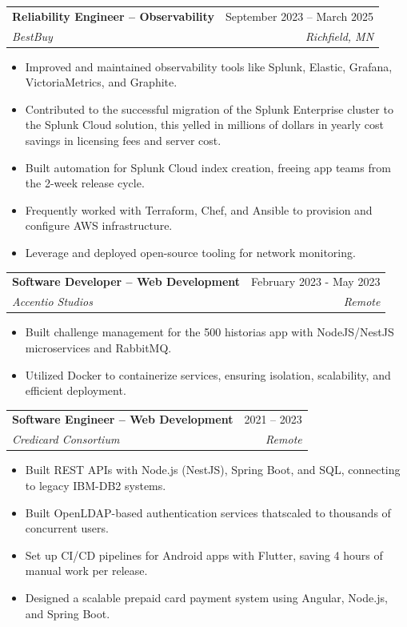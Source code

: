 \documentclass[letterpaper,11pt]{article}
\makeatletter
\newcommand{\resumeSubheading}[4]{
  \vspace{-2pt}\item
    \begin{tabular*}{0.97\textwidth}[t]{l@{\extracolsep{\fill}}r}
      \textbf{#1} & #2 \\
      \textit{\small#3} & \textit{\small #4} \\
    \end{tabular*}\vspace{-7pt}
}
\makeatother
\begin{document}
    \resumeSubheading
      {Reliability Engineer – Observability}{September 2023 – March 2025}
      {BestBuy}{Richfield, MN}
      \begin{itemize}
      \setlength\itemsep{-0.1em}
      \item Improved and maintained observability tools like Splunk, Elastic, Grafana, VictoriaMetrics, and Graphite.
      \item Contributed to the successful migration of the Splunk Enterprise cluster to the Splunk Cloud solution, this yelled in millions of dollars in yearly cost savings in licensing fees and server cost.
      \item Built automation for Splunk Cloud index creation, freeing app teams from the 2-week release cycle.
      \item Frequently worked with Terraform, Chef, and Ansible to provision and configure AWS infrastructure.
      \item Leverage and deployed open-source tooling for network monitoring.
      \end{itemize}

      
    \resumeSubheading
      {Software Developer – Web Development}{February 2023 - May 2023}
      {Accentio Studios}{Remote}
      \begin{itemize}
      \setlength\itemsep{-0.1em}
      \item Built challenge management for the 500 historias app with NodeJS/NestJS microservices and RabbitMQ.
      \item Utilized Docker to containerize services, ensuring isolation, scalability, and efficient deployment.
      \end{itemize}

      \resumeSubheading
      {Software Engineer – Web Development}{2021 – 2023}
      {Credicard Consortium}{Remote}
      \begin{itemize}
      \setlength\itemsep{-0.1em}
      \item Built REST APIs with Node.js (NestJS), Spring Boot, and SQL, connecting to legacy IBM-DB2 systems.
      \item Built OpenLDAP-based authentication services thatscaled to thousands of concurrent users.
      \item Set up CI/CD pipelines for Android apps with Flutter, saving 4 hours of manual work per release.
      \item Designed a scalable prepaid card payment system using Angular, Node.js, and Spring Boot.
      \end{itemize}
\end{document}
